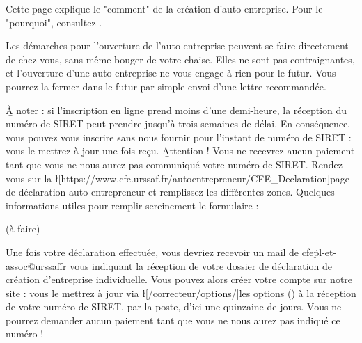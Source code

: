 ﻿Cette page explique le "comment" de la création d'auto-entreprise. Pour le "pourquoi", consultez .

Les démarches pour l'ouverture de l'auto-entreprise peuvent se faire directement de chez vous, sans même bouger de votre chaise.
Elles ne sont pas contraignantes, et l'ouverture d'une auto-entreprise ne vous engage à rien pour le futur. Vous pourrez la fermer dans le futur par simple envoi d'une lettre recommandée.

\b{À noter} : si l'inscription en ligne prend moins d'une demi-heure, la réception du numéro de SIRET peut prendre jusqu'à trois semaines de délai. En conséquence, vous pouvez vous inscrire sans nous fournir pour l'instant de numéro de SIRET : vous le mettrez à jour une fois reçu. \b{Attention !} Vous ne recevrez aucun paiement tant que vous ne nous aurez pas communiqué votre numéro de SIRET.
Rendez-vous sur la \l[https://www.cfe.urssaf.fr/autoentrepreneur/CFE_Declaration]{page de déclaration auto entrepreneur} et remplissez les différentes zones. Quelques informations utiles pour remplir sereinement le formulaire :
\begin{itemize}
	\li (à faire)
\end{itemize}

Une fois votre déclaration effectuée, vous devriez recevoir un mail de cfe\.pl-et-assoc@urssaf\.fr vous indiquant la réception de votre dossier de déclaration de création d'entreprise individuelle.
Vous pouvez alors créer votre compte sur notre site : vous le mettrez à jour via \l[/correcteur/options/]{les options} () à la réception de votre numéro de SIRET, par la poste, d'ici une quinzaine de jours. \b{Vous ne pourrez demander aucun paiement tant que vous ne nous aurez pas indiqué ce numéro} !